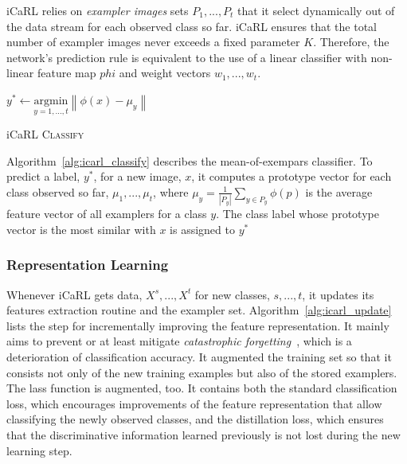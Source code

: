 iCaRL relies on \textit{exampler images} sets $P_1, ..., P_t$ that it select dynamically out of the data stream for each observed class so far. iCaRL ensures that the total number of exampler images never exceeds a fixed parameter $K$. Therefore, the network's prediction rule is equivalent to the use of a linear classifier with non-linear feature map $phi$ and weight vectors $w_1, ..., w_t$.

\begin{algorithm}[ht]
  $y^{*} \leftarrow \underset{y = 1, ..., t}{\textrm{argmin}} \left\| \phi(x) - \mu_y \right\|$  \\
  
\caption{ iCaRL \textsc{Classify} \label{alg:icarl_classify}}
\end{algorithm}

Algorithm~\ref{alg:icarl_classify} describes the mean-of-exempars classifier. To predict a label, $y^*$, for a new image, $x$, it computes a prototype vector for each class observed so far, $\mu_1, ..., \mu_t$, where $\mu_y = \frac{1}{\left| P_y \right|} \sum_{y \in P_y} \phi\left( p \right)$ is the average feature vector of all examplers for a class $y$. The class label whose prototype vector is the most similar with $x$ is assigned to $y^*$

\subsubsection{Representation Learning}
\label{sec:icarl_learning}

Whenever iCaRL gets data, $X^s, ..., X^t$ for new classes, $s, ..., t$, it updates its features extraction routine and the exampler set. Algorithm~\ref{alg:icarl_update} lists the step for incrementally improving the feature representation. It mainly aims to prevent or at least mitigate \textit{catastrophic forgetting}~\cite{McCloskey:1989aa}, which is a deterioration of classification accuracy. It augmented the training set so that it consists not only of the new training examples but also of the stored examplers. The lass function is augmented, too. It contains both the standard classification loss, which encourages improvements of the feature representation that allow classifying the newly observed classes, and the distillation loss, which ensures that the discriminative information learned previously is not lost during the new learning step.

